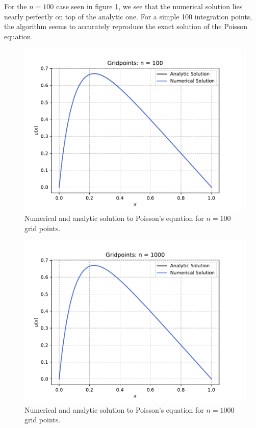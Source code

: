\documentclass[a4paper,10pt]{article}
\begin{document}
For the $n = 100$ case seen in figure \ref{fig:2}, we see that the numerical solution lies nearly perfectly on top of the analytic one. For a simple 100 integration points, the algorithm seems to accurately reproduce the exact solution of the Poisson equation.



\begin{figure}[h]
  \centering
  \includegraphics[width=0.9\linewidth]{figures/fig_100_b.pdf}
  \caption{Numerical and analytic solution to Poisson's equation for $n = 100$ grid points.}
  \label{fig:2}
\end{figure}


\begin{figure}[h]
  \centering
  \includegraphics[width=0.9\linewidth]{figures/fig_1000_b.pdf}
  \caption{Numerical and analytic solution to Poisson's equation for $n = 1000$ grid points.}
  \label{fig:3}
\end{figure}
\end{document}
